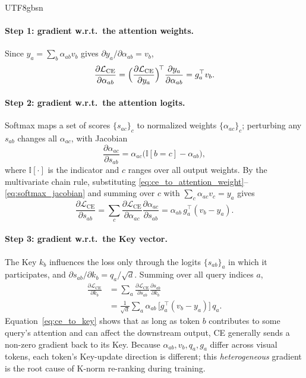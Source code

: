 \documentclass[10pt,twocolumn,letterpaper]{article}
\begin{document}
\begin{CJK}{UTF8}{gbsn}
\paragraph{Step 1: gradient w.r.t.\ the attention weights.}
Since $y_a=\sum_b\alpha_{ab}v_b$ gives $\partial y_a/\partial\alpha_{ab}=v_b$,
\begin{equation}
    \frac{\partial\mathcal{L}_{\mathrm{CE}}}{\partial\alpha_{ab}}
    =\Bigl(\frac{\partial\mathcal{L}_{\mathrm{CE}}}{\partial y_a}\Bigr)^{\!\top}
    \frac{\partial y_a}{\partial\alpha_{ab}}
    =g_a^\top v_b.
    \label{eq:ce_to_attention_weight}
\end{equation}

\paragraph{Step 2: gradient w.r.t.\ the attention logits.}
Softmax maps a set of scores $\{s_{ac}\}_c$ to normalized weights
$\{\alpha_{ac}\}_c$; perturbing any $s_{ab}$ changes all $\alpha_{ac}$, with
Jacobian
\begin{equation}
    \frac{\partial\alpha_{ac}}{\partial s_{ab}}
    =\alpha_{ac}\bigl(\mathbb{I}[b=c]-\alpha_{ab}\bigr),
    \label{eq:softmax_jacobian}
\end{equation}
where $\mathbb{I}[\cdot]$ is the indicator and $c$ ranges over all output weights.
By the multivariate chain rule, substituting
\eqref{eq:ce_to_attention_weight}--\eqref{eq:softmax_jacobian} and summing over
$c$ with $\sum_c\alpha_{ac}v_c=y_a$ gives
\begin{equation}
    \frac{\partial\mathcal{L}_{\mathrm{CE}}}{\partial s_{ab}}
    =\sum_c\frac{\partial\mathcal{L}_{\mathrm{CE}}}{\partial\alpha_{ac}}
    \frac{\partial\alpha_{ac}}{\partial s_{ab}}
    =\alpha_{ab}\,g_a^\top(v_b-y_a).
    \label{eq:ce_to_logit}
\end{equation}
\paragraph{Step 3: gradient w.r.t.\ the Key vector.}
The Key $k_b$ influences the loss only through the logits $\{s_{ab}\}_a$ in which
it participates, and $\partial s_{ab}/\partial k_b=q_a/\sqrt d$. Summing over all
query indices $a$,
\begin{equation}
\begin{aligned}
    \frac{\partial\mathcal{L}_{\mathrm{CE}}}{\partial k_b}
    &=\sum_a\frac{\partial\mathcal{L}_{\mathrm{CE}}}{\partial s_{ab}}
    \frac{\partial s_{ab}}{\partial k_b}\\
    &=\frac{1}{\sqrt d}\sum_a
    \alpha_{ab}\,\bigl[g_a^\top(v_b-y_a)\bigr]\,q_a.
\end{aligned}
    \label{eq:ce_to_key}
\end{equation}
Equation~\eqref{eq:ce_to_key} shows that as long as token $b$ contributes to some
query's attention and can affect the downstream output, CE generally sends a
non-zero gradient back to its Key. Because $\alpha_{ab},v_b,q_a,g_a$ differ across
visual tokens, each token's Key-update direction is different; this
\emph{heterogeneous} gradient is the root cause of K-norm re-ranking during
training.


\end{CJK}
\end{document}
